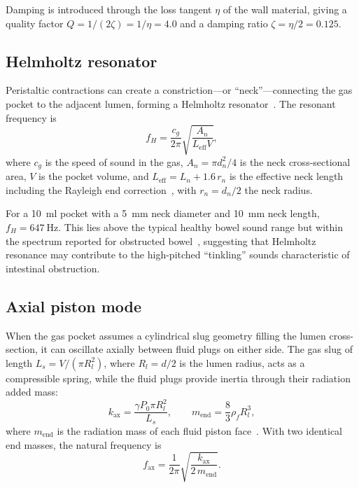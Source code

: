 \documentclass[12pt]{article}
\begin{document}
Damping is introduced through the loss tangent $\eta$ of the wall material,
giving a quality factor $Q = 1/(2\zeta) = 1/\eta = 4.0$ and a damping ratio
$\zeta = \eta/2 = 0.125$.

\subsection{Helmholtz resonator}
\label{sec:helmholtz}

Peristaltic contractions can create a constriction---or ``neck''---connecting
the gas pocket to the adjacent lumen, forming a Helmholtz
resonator~\cite{Rayleigh1896, Kinsler1999}.  The resonant frequency is
\begin{equation}
  f_H = \frac{c_g}{2\pi}\sqrt{\frac{A_n}{L_\mathrm{eff} V}},
  \label{eq:helmholtz}
\end{equation}
where $c_g$ is the speed of sound in the gas, $A_n = \pi d_n^2/4$ is the
neck cross-sectional area, $V$ is the pocket volume, and
$L_\mathrm{eff} = L_n + 1.6\,r_n$ is the effective neck length including the
Rayleigh end correction~\cite{Rayleigh1896}, with $r_n = d_n/2$ the neck
radius.

For a \SI{10}{\milli\litre} pocket with a \SI{5}{\milli\metre} neck diameter
and \SI{10}{\milli\metre} neck length, $f_H = \SI{647}{\hertz}$.  This
lies above the typical healthy bowel sound range but within the spectrum
reported for obstructed bowel~\cite{Ching2012, Yoshino1990}, suggesting that
Helmholtz resonance may contribute to the high-pitched ``tinkling'' sounds
characteristic of intestinal obstruction.

\subsection{Axial piston mode}
\label{sec:axial}

When the gas pocket assumes a cylindrical slug geometry filling the lumen
cross-section, it can oscillate axially between fluid plugs on either side.
The gas slug of length $L_s = V/(\pi R_l^2)$, where $R_l = d/2$ is the
lumen radius, acts as a compressible spring, while the fluid plugs provide
inertia through their radiation added mass:
\begin{equation}
  k_\mathrm{ax} = \frac{\gamma P_0 \pi R_l^2}{L_s}, \qquad
  m_\mathrm{end} = \frac{8}{3}\rho_f R_l^3,
  \label{eq:axial_params}
\end{equation}
where $m_\mathrm{end}$ is the radiation mass of each fluid piston
face~\cite{Kinsler1999}.  With two identical end masses, the natural
frequency is
\begin{equation}
  f_\mathrm{ax} = \frac{1}{2\pi}\sqrt{\frac{k_\mathrm{ax}}{2\,m_\mathrm{end}}}.
  \label{eq:axial}
\end{equation}
\end{document}
